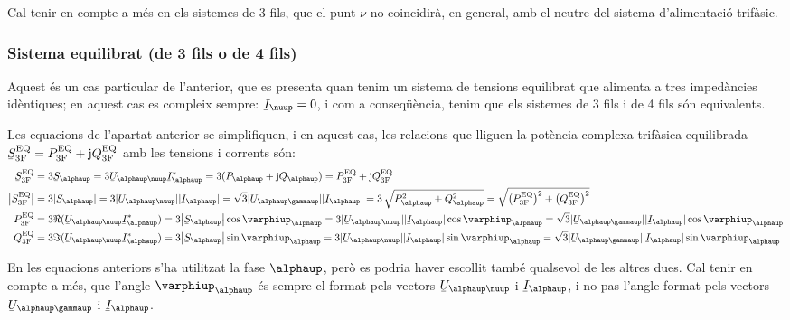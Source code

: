 Cal tenir en compte a m\'{e}s en els sistemes de 3 fils, que el punt
$\nu$ no coincidir\`{a}, en general, amb el neutre del sistema
d'alimentaci\'{o} trif\`{a}sic.

\subsubsection{Sistema equilibrat (de 3 fils o de 4 fils)}

Aquest \'{e}s un cas particular de l'anterior, que es presenta quan
tenim un sistema de tensions equilibrat que alimenta a tres
imped\`{a}ncies id\`{e}ntiques; en aquest cas es compleix sempre:
$\cmplx{I}_\nuup=0$, i com a conseq\"{u}\`{e}ncia, tenim que els sistemes de 3
fils i de 4 fils s\'{o}n equivalents.

Les equacions de l'apartat anterior se simplifiquen, i en aquest
cas, les relacions que lliguen la  pot\`{e}ncia complexa trif\`{a}sica
equilibrada $\cmplx{S}\ped{3F}\ap{EQ} = P\ped{3F}\ap{EQ} + \ju
Q\ped{3F}\ap{EQ}$ amb les tensions i corrents s\'{o}n:
\begin{align}
    \cmplx{S}\ped{3F}\ap{EQ} &= 3\cmplx{S}_\alphaup = 3\cmplx{U}_{\alphaup\nuup} \cmplx{I}_\alphaup^* =
    3 (P_\alphaup + \ju Q_\alphaup) = P\ped{3F}\ap{EQ} +\ju Q\ped{3F}\ap{EQ} \label{eq:s_3f_eq}\\
    \big|\cmplx{S}\ped{3F}\ap{EQ}\big| &= 3|\cmplx{S}_\alphaup | =   3 |\cmplx{U}_{\alphaup\nuup}| |\cmplx{I}_\alphaup| =
    \sqrt{3} |\cmplx{U}_{\alphaup\gammaup}| |\cmplx{I}_\alphaup| = 3\,\sqrt{P_\alphaup^2 + Q_\alphaup^2} =
    \sqrt{\big(P\ped{3F}\ap{EQ}\big)^2 + \big(Q\ped{3F}\ap{EQ}\big)^2} \\
    P\ped{3F}\ap{EQ} &= 3\Re(\cmplx{U}_{\alphaup\nuup} \cmplx{I}_\alphaup^*) =
    3\big|\cmplx{S}_\alphaup\big| \cos \varphiup_\alphaup = 3 |\cmplx{U}_{\alphaup\nuup}|
    |\cmplx{I}_\alphaup|\label{eq:p_3f_34}
    \cos \varphiup_\alphaup = \sqrt{3} |\cmplx{U}_{\alphaup\gammaup}||\cmplx{I}_\alphaup| \cos \varphiup_\alphaup \\
    Q\ped{3F}\ap{EQ} &= 3\Im(\cmplx{U}_{\alphaup\nuup} \cmplx{I}_\alphaup^*) =
    3\big|\cmplx{S}_\alphaup\big|  \sin \varphiup_\alphaup = 3 |\cmplx{U}_{\alphaup\nuup}| |\cmplx{I}_\alphaup|\label{eq:q_3f_34}
    \sin\varphiup_\alphaup=\sqrt{3} |\cmplx{U}_{\alphaup\gammaup}||\cmplx{I}_\alphaup|\sin \varphiup_\alphaup
\end{align}

En les equacions anteriors s'ha utilitzat la fase $\alphaup$, per\`{o} es
podria haver escollit tamb\'{e} qualsevol de les altres dues. Cal tenir
en compte a m\'{e}s, que l'angle $\varphiup_\alphaup$ \'{e}s sempre el format
pels vectors $\cmplx{U}_{\alphaup\nuup}$ i $\cmplx{I}_\alphaup$, i no pas
l'angle format pels vectors $\cmplx{U}_{\alphaup\gammaup}$ i
$\cmplx{I}_\alphaup$.

